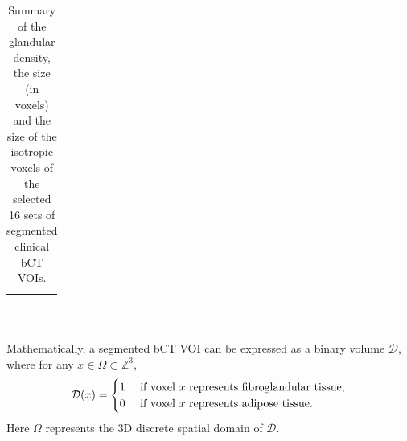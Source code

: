 \documentclass[journal]{IEEEtran}
\begin{document}
\begin{table}[!htb]
\begin{center}
\begin{tabular}{ m{1cm} m{1.3cm} m{2.6cm} m{1.8cm}}
      \centering{\#9}
        & \centering{25.7\%}
      & \centering{$97 \times 97 \times 97$}
      & \centering{$\SI{0.361}{\mm}$}
        \tabularnewline%

      \centering{\#10}
        & \centering{13.9\%}
      & \centering{$101 \times 101 \times 101$}
      & \centering{$\SI{0.349}{\mm}$}
        \tabularnewline%

      \centering{\#11}
        & \centering{14.5\%}
      & \centering{$128 \times 128 \times 128$}
      & \centering{$\SI{0.275}{\mm}$}
        \tabularnewline%

      \centering{\#12}
        & \centering{09.8\%}
      & \centering{$87 \times 87 \times 87$}
      & \centering{$\SI{0.405}{\mm}$}
        \tabularnewline%

      \centering{\#13}
        & \centering{27.1\%}
      & \centering{$107 \times 107 \times 107$}
      & \centering{$\SI{0.329}{\mm}$}
        \tabularnewline%

      \centering{\#14}
        & \centering{25.0\%}
      & \centering{$87 \times 87 \times 87$}
      & \centering{$\SI{0.405}{\mm}$}
        \tabularnewline%

      \centering{\#15}
        & \centering{20.5\%}
      & \centering{$124 \times 124 \times 124$}
      & \centering{$\SI{0.283}{\mm}$}
        \tabularnewline%

      \centering{\#16}
        & \centering{17.2\%}
      & \centering{$126 \times 126 \times 126$}
      & \centering{$\SI{0.279}{\mm}$}
        \tabularnewline%

      \bottomrule

    \end{tabular}
    \caption{Summary of the glandular density, the size (in voxels)
      and the size of the isotropic voxels of the selected 16 sets of
      segmented clinical bCT VOIs.}
    \label{tab:summary-info-extract}
  \end{center}
\end{table}


Mathematically, a segmented bCT VOI can be expressed as a binary
volume $\mathcal{D}$, where for any
$x \in \Omega \subset \mathbb{Z}^3$,
\begin{equation}
  \label{eq:bct-discrete-form}
  \mathcal{D}(x) =
  \begin{cases}
    1 & \textnormal{ if voxel } x \textnormal{ represents
      fibroglandular tissue}, \\
    0 & \textnormal{ if voxel } x \textnormal{ represents
      adipose tissue}. \\
  \end{cases}
\end{equation}
Here $\Omega$ represents the 3D discrete spatial domain of
$\mathcal{D}$.
\end{document}
